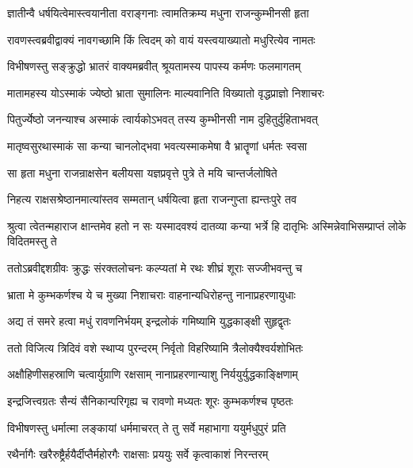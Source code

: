 \twolineshloka
{ज्ञातीन्वै धर्षयित्वेमास्त्वयानीता वराङ्गनाः}
{त्वामतिक्रम्य मधुना राजन्कुम्भीनसी हृता} %

\twolineshloka
{रावणस्त्वब्रवीद्वाक्यं नावगच्छामि किं त्विदम्}
{को वायं यस्त्वयाख्यातो मधुरित्येव नामतः} %

\twolineshloka
{विभीषणस्तु सङ्क्रुद्धो भ्रातरं वाक्यमब्रवीत्}
{श्रूयतामस्य पापस्य कर्मणः फलमागतम्} %

\twolineshloka
{मातामहस्य योऽस्माकं ज्येष्ठो भ्राता सुमालिनः}
{माल्यवानिति विख्यातो वृद्धप्राज्ञो निशाचरः} %

\twolineshloka
{पितुर्ज्येष्ठो जनन्याश्च अस्माकं त्वार्यकोऽभवत्}
{तस्य कुम्भीनसी नाम दुहितुर्दुहिताभवत्} %

\twolineshloka
{मातृष्वसुरथास्माकं सा कन्या चानलोद्भवा}
{भवत्यस्माकमेषा वै भ्रातॄणां धर्मतः स्वसा} %

\twolineshloka
{सा हृता मधुना राजन्राक्षसेन बलीयसा}
{यज्ञप्रवृत्ते पुत्रे ते मयि चान्तर्जलोषिते} %

\twolineshloka
{निहत्य राक्षसश्रेष्ठानमात्यांस्तव सम्मतान्}
{धर्षयित्वा हृता राजन्गुप्ता ह्यन्तःपुरे तव} %

\threelineshloka
{श्रुत्वा त्वेतन्महाराज क्षान्तमेव हतो न सः}
{यस्मादवश्यं दातव्या कन्या भर्त्रे हि दातृभिः}
{अस्मिन्नेवाभिसम्प्राप्तं लोके विदितमस्तु ते} %

\twolineshloka
{ततोऽब्रवीद्दशग्रीवः क्रुद्धः संरक्तलोचनः}
{कल्प्यतां मे रथः शीघ्रं शूराः सज्जीभवन्तु च} %

\twolineshloka
{भ्राता मे कुम्भकर्णश्च ये च मुख्या निशाचराः}
{वाहनान्यधिरोहन्तु नानाप्रहरणायुधाः} %

\twolineshloka
{अद्य तं समरे हत्वा मधुं रावणनिर्भयम्}
{इन्द्रलोकं गमिष्यामि युद्धकाङ्क्षी सुहृद्वृतः} %

\twolineshloka
{ततो विजित्य त्रिदिवं वशे स्थाप्य पुरन्दरम्}
{निर्वृतो विहरिष्यामि त्रैलोक्यैश्वर्यशोभितः} %

\twolineshloka
{अक्षौहिणीसहस्राणि चत्वार्युग्राणि रक्षसाम्}
{नानाप्रहरणान्याशु निर्ययुर्युद्धकाङ्क्षिणाम्} %

\twolineshloka
{इन्द्रजित्त्वग्रतः सैन्यं सैनिकान्परिगृह्य च}
{रावणो मध्यतः शूरः कुम्भकर्णश्च पृष्ठतः} %

\twolineshloka
{विभीषणस्तु धर्मात्मा लङ्कायां धर्ममाचरत्}
{ते तु सर्वे महाभागा ययुर्मधुपुरं प्रति} %

\twolineshloka
{रथैर्नागैः खरैरुष्ट्रैर्हयैर्दीप्तैर्महोरगैः}
{राक्षसाः प्रययुः सर्वे कृत्वाकाशं निरन्तरम्} %

